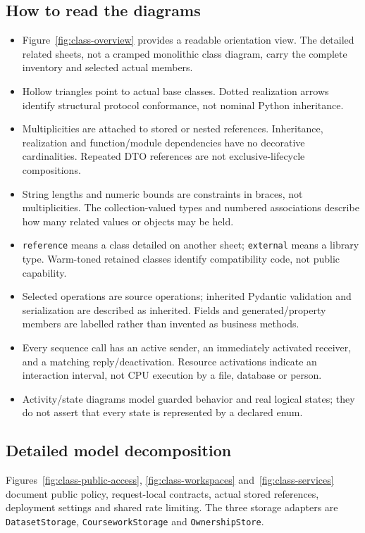 \documentclass[11pt,a4paper]{article}
\begin{document}
\subsection{How to read the diagrams}
\begin{itemize}
\item Figure~\ref{fig:class-overview} provides a readable orientation view.
The detailed related sheets, not a cramped monolithic class diagram, carry the
complete inventory and selected actual members.
\item Hollow triangles point to actual base classes. Dotted realization arrows
identify structural protocol conformance, not nominal Python inheritance.
\item Multiplicities are attached to stored or nested references. Inheritance,
realization and function/module dependencies have no decorative cardinalities.
Repeated DTO references are not exclusive-lifecycle compositions.
\item String lengths and numeric bounds are constraints in braces, not
multiplicities. The collection-valued types and numbered associations describe
how many related values or objects may be held.
\item \texttt{reference} means a class detailed on another sheet;
\texttt{external} means a library type. Warm-toned retained classes identify
compatibility code, not public capability.
\item Selected operations are source operations; inherited Pydantic validation
and serialization are described as inherited. Fields and generated/property
members are labelled rather than invented as business methods.
\item Every sequence call has an active sender, an immediately activated
receiver, and a matching reply/deactivation. Resource activations indicate an
interaction interval, not CPU execution by a file, database or person.
\item Activity/state diagrams model guarded behavior and real logical states;
they do not assert that every state is represented by a declared enum.
\end{itemize}

\subsection{Detailed model decomposition}
Figures~\ref{fig:class-public-access}, \ref{fig:class-workspaces}
and~\ref{fig:class-services} document public policy, request-local contracts,
actual stored references, deployment settings and shared rate limiting.
The three storage adapters are \texttt{DatasetStorage},
\texttt{CourseworkStorage} and \texttt{OwnershipStore}.
\end{document}
